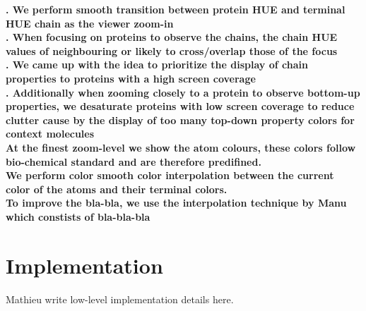\documentclass[review,journal]{vgtc}         %
\begin{document}
\textbf{. We perform smooth transition between protein HUE and terminal HUE chain as the viewer zoom-in} \\

\textbf{. When focusing on proteins to observe the chains, the chain HUE values of neighbouring or likely to cross/overlap those of the focus} \\

\textbf{. We came up with the idea to prioritize the display of chain properties to proteins with a high screen coverage} \\

\textbf{. Additionally when zooming closely to a protein to observe bottom-up properties, we desaturate proteins with low screen coverage to reduce clutter cause by the display of too many top-down property colors for context molecules } \\ 


\textbf{At the finest zoom-level we show the atom colours, these colors follow bio-chemical standard and are therefore predifined. } \\

\textbf{We perform color smooth color interpolation between the current color of the atoms and their terminal colors. } \\
	
\textbf{To improve the bla-bla, we use the interpolation technique by Manu which constists of bla-bla-bla} \\



\section{Implementation}

Mathieu write low-level implementation details here.

%
%
%
%
%
%
\end{document}
